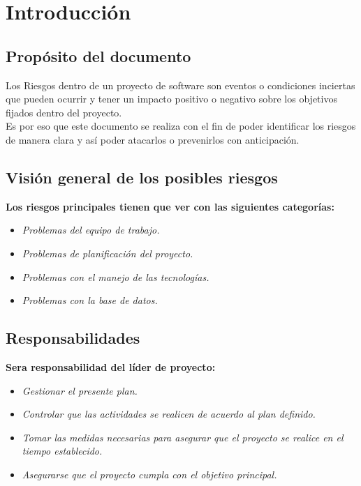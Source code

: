 \documentclass[12pt,a4paper]{article}
\begin{document}


\section{Introducción}
\vspace{1 cm}
\subsection{Propósito del documento}
Los Riesgos dentro de un proyecto de software son eventos o condiciones inciertas que pueden ocurrir y tener un impacto positivo o negativo sobre los objetivos fijados dentro del proyecto.\\
Es por eso que este documento se realiza con el fin de poder identificar los riesgos de manera clara y así poder atacarlos o prevenirlos con anticipación.\\
\subsection{Visión general de los posibles riesgos}
\textbf {Los riesgos principales tienen que ver con las siguientes categorías:} \\
\begin{itemize}
\item \textit{Problemas del equipo de trabajo.}
\item \textit{Problemas de planificación del proyecto.}
\item \textit{Problemas con el manejo de las tecnologías.}
\item \textit{Problemas con la base de datos.}
\end{itemize}

\subsection{Responsabilidades}
\textbf {Sera responsabilidad del líder de proyecto:} \\
\begin{itemize}
\item \textit{Gestionar el presente plan.}
\item \textit{Controlar que las actividades se realicen de acuerdo al plan definido.}
\item \textit{Tomar las medidas necesarias para asegurar que el proyecto se realice en el tiempo establecido.}
\item \textit{Asegurarse que el proyecto cumpla con el objetivo principal.}
\end{itemize}
\vspace{1 cm}
\end{document}

